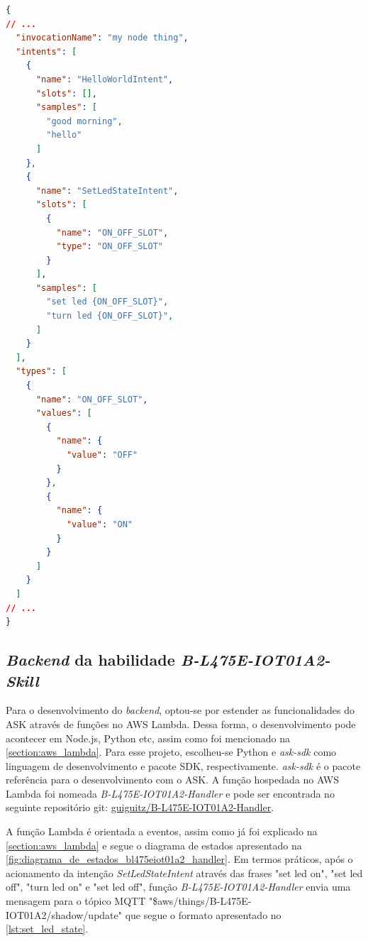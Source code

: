 \begin{lstlisting}[float=htbp,language=json,firstnumber=1,caption={Trecho do arquivo JSON que descreve o \textit{frontend} da habilidade \textit{B-L475E-IOT01A2-Skill}.},label=lst:frontend_bl475eiot01a2_skill]
{
// ...
  "invocationName": "my node thing",
  "intents": [
    {
      "name": "HelloWorldIntent",
      "slots": [],
      "samples": [
        "good morning",
        "hello"
      ]
    },
    {
      "name": "SetLedStateIntent",
      "slots": [
        {
          "name": "ON_OFF_SLOT",
          "type": "ON_OFF_SLOT"
        }
      ],
      "samples": [
        "set led {ON_OFF_SLOT}",
        "turn led {ON_OFF_SLOT}",
      ]
    }
  ],
  "types": [
    {
      "name": "ON_OFF_SLOT",
      "values": [
        {
          "name": {
            "value": "OFF"
          }
        },
        {
          "name": {
            "value": "ON"
          }
        }
      ]
    }
  ]
// ...
}
\end{lstlisting}

\subsection{\textit{Backend} da habilidade \textit{B-L475E-IOT01A2-Skill}}\label{subscrion:backend_bl475eiot01a2_skill}

Para o desenvolvimento do \textit{backend}, optou-se por estender as funcionalidades do ASK através de funções no AWS Lambda. Dessa forma, o desenvolvimento pode acontecer em Node.js, Python etc, assim como foi mencionado na \autoref{section:aws_lambda}. Para esse projeto, escolheu-se Python e \textit{ask-sdk} como linguagem de desenvolvimento e pacote SDK, respectivamente. \textit{ask-sdk} é o pacote referência para o desenvolvimento com o ASK. A função hospedada no AWS Lambda foi nomeada \textit{B-L475E-IOT01A2-Handler} e pode ser encontrada no seguinte repositório git: \href{https://github.com/guiguitz/B-L475E-IOT01A2-Handler}{guiguitz/B-L475E-IOT01A2-Handler}.

A função Lambda é orientada a eventos, assim como já foi explicado na \autoref{section:aws_lambda} e segue o diagrama de estados apresentado na \autoref{fig:diagrama_de_estados_bl475eiot01a2_handler}. Em termos práticos, após o acionamento da intenção \textit{SetLedStateIntent} através das frases "set led on", "set led off", "turn led on" e "set led off", função \textit{B-L475E-IOT01A2-Handler} envia uma mensagem para o tópico MQTT "\$aws/things/B-L475E-IOT01A2/shadow/update" que segue o formato apresentado no \autoref{lst:set_led_state}.

